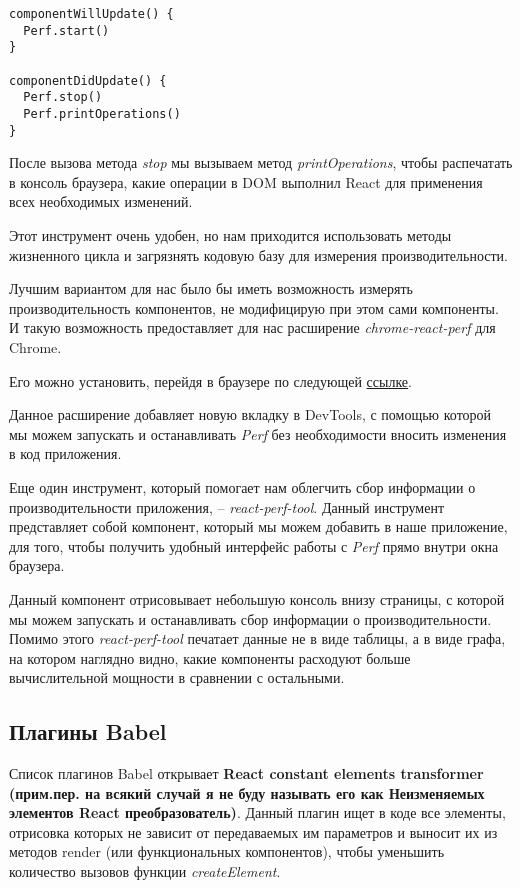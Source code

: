\begin{lstlisting}
componentWillUpdate() {
  Perf.start()
}

componentDidUpdate() {
  Perf.stop()
  Perf.printOperations()
}
\end{lstlisting}

После вызова метода \textit{stop} мы вызываем метод \textit{printOperations}, чтобы распечатать в консоль браузера, какие операции в DOM выполнил React для применения всех необходимых изменений.

Этот инструмент очень удобен, но нам приходится использовать методы жизненного цикла и загрязнять кодовую базу для измерения производительности.

Лучшим вариантом для нас было бы иметь возможность измерять производительность компонентов, не модифицирую при этом сами компоненты. И такую возможность предоставляет для нас расширение \textit{chrome-react-perf} для Chrome.

Его можно установить, перейдя в браузере по следующей \href{https://chrome.google.com/webstore/detail/reactperf/hacmcodfllhbnekmghgdlplbdnahmhmm}{ссылке}.

Данное расширение добавляет новую вкладку в DevTools, с помощью которой мы можем запускать и останавливать \textit{Perf} без необходимости вносить изменения в код приложения.

Еще один инструмент, который помогает нам облегчить сбор информации о производительности приложения, -- \textit{react-perf-tool}. Данный инструмент представляет собой компонент, который мы можем добавить в наше приложение, для того, чтобы получить удобный интерфейс работы с \textit{Perf} прямо внутри окна браузера.

Данный компонент отрисовывает небольшую консоль внизу страницы, с которой мы можем запускать и останавливать сбор информации о производительности. Помимо этого \textit{react-perf-tool} печатает данные не в виде таблицы, а в виде графа, на котором наглядно видно,  какие компоненты расходуют больше вычислительной мощности в сравнении с остальными. 

\subsection{Плагины Babel}

Список плагинов Babel открывает \textbf{React constant elements transformer (прим.пер. на всякий случай я не буду называть его как Неизменяемых элементов React преобразователь)}. Данный плагин ищет в коде все элементы, отрисовка которых не зависит от передаваемых им параметров и выносит их из методов render (или функциональных компонентов), чтобы уменьшить количество вызовов функции \textit{createElement}.

